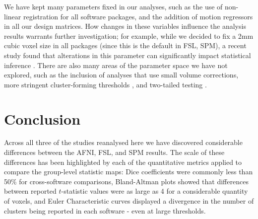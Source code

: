 We have kept many parameters fixed in our analyses, such as the use of non-linear registration for all software packages, and the addition of motion regressors in all our design matrices. How changes in these variables influence the analysis results warrants further investigation; for example, while we decided to fix a 2mm cubic voxel size in all packages (since this is the default in FSL, SPM), a recent study found that alterations in this parameter can significantly impact statistical inference \citep{Mueller2017-pn}. There are also many areas of the parameter space we have not explored, such as the inclusion of analyses that use small volume corrections, more stringent cluster-forming thresholds \citep{Eklund2016-ak, Woo2014-ji}, and two-tailed testing \citep{Chen2018-am}. 

\section{Conclusion}

Across all three of the studies reanalysed here we have discovered considerable differences between the AFNI, FSL, and SPM results. The scale of these differences has been highlighted by each of the quantitative metrics applied to compare the group-level statistic maps: Dice coefficients were commonly less than 50\% for cross-software comparisons, Bland-Altman plots showed that differences between reported $t$-statistic values were as large as 4 for a considerable quantity of voxels, and Euler Characteristic curves displayed a divergence in the number of clusters being reported in each software - even at large thresholds. 

